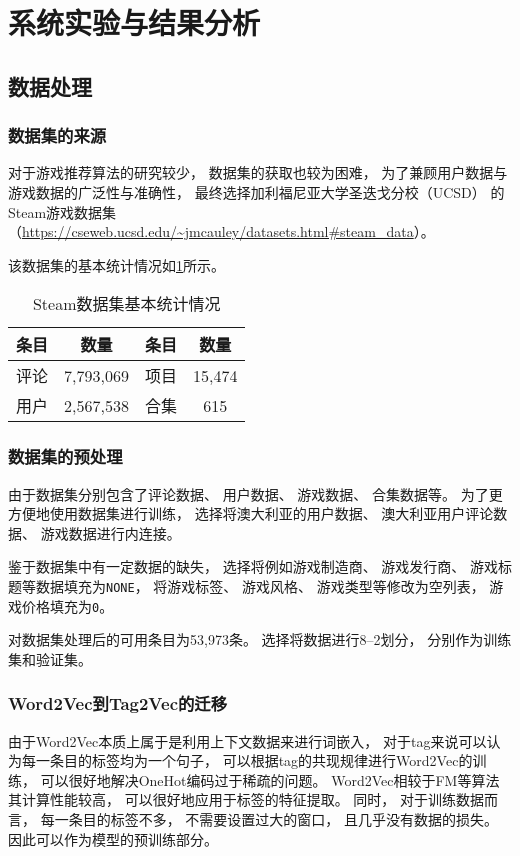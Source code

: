 \section{系统实验与结果分析}

\subsection{数据处理}

\subsubsection{数据集的来源}

对于游戏推荐算法的研究较少，
数据集的获取也较为困难，
为了兼顾用户数据与游戏数据的广泛性与准确性，
最终选择加利福尼亚大学圣迭戈分校（UCSD）
的Steam游戏数据集
（\url{https://cseweb.ucsd.edu/~jmcauley/datasets.html#steam_data}）。

该数据集的基本统计情况如\cref{tb:dataset}所示。

\begin{table}[!htbp]
	\begin{center}
		\caption{Steam数据集基本统计情况}\label{tb:dataset}
		\begin{tabular}{cccc}
			\toprule
			条目 & 数量        & 条目 & 数量     \\
			\midrule
			评论 & 7,793,069 & 项目 & 15,474 \\
			用户 & 2,567,538 & 合集 & 615    \\
			\bottomrule
		\end{tabular}
	\end{center}
\end{table}

\subsubsection{数据集的预处理}

由于数据集分别包含了评论数据、
用户数据、
游戏数据、
合集数据等。
为了更方便地使用数据集进行训练，
选择将澳大利亚的用户数据、
澳大利亚用户评论数据、
游戏数据进行内连接。

鉴于数据集中有一定数据的缺失，
选择将例如游戏制造商、
游戏发行商、
游戏标题等数据填充为\verb|NONE|，
将游戏标签、
游戏风格、
游戏类型等修改为空列表，
游戏价格填充为\verb|0|。

对数据集处理后的可用条目为53,973条。
选择将数据进行8--2划分，
分别作为训练集和验证集。

\subsubsection{Word2Vec到Tag2Vec的迁移}

由于Word2Vec本质上属于是利用上下文数据来进行词嵌入，
对于tag来说可以认为每一条目的标签均为一个句子，
可以根据tag的共现规律进行Word2Vec的训练，
可以很好地解决OneHot编码过于稀疏的问题。
Word2Vec相较于FM等算法其计算性能较高，
可以很好地应用于标签的特征提取。
同时，
对于训练数据而言，
每一条目的标签不多，
不需要设置过大的窗口，
且几乎没有数据的损失。
因此可以作为模型的预训练部分。